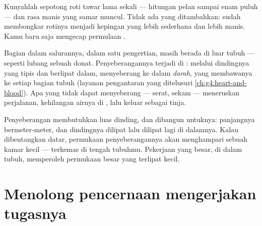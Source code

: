 \begin{example}\label{ex:g4:journey-of-food:sweet}
Kunyahlah sepotong roti tawar lama sekali --- hitungan pelan sampai
enam puluh --- dan rasa manis yang samar muncul. Tidak ada yang
ditambahkan:  sudah membongkar rotinya menjadi kepingan yang
lebih sederhana dan lebih manis. Kamu baru saja mengecap permulaan
.
\end{example}

\begin{proposition}\label{prop:g4:journey-of-food:absorb}
Bagian dalam salurannya, dalam satu pengertian, masih berada di luar
tubuh --- seperti lubang sebuah donat. Penyeberangannya terjadi di
\emph{}: melalui dindingnya yang tipis dan berlipat dalam,
 menyeberang ke dalam \emph{darah}, yang
membawanya ke setiap bagian tubuh (layanan pengantaran yang
ditelusuri \cref{ch:g4:heart-and-blood}). Apa yang tidak dapat
menyeberang --- serat, sekam --- meneruskan perjalanan, kehilangan
airnya di , lalu keluar sebagai tinja.
\end{proposition}
\admitted

\begin{remark}\label{rem:g4:journey-of-food:surface}
Penyeberangan membutuhkan luas dinding, dan  dibangun
untuknya: panjangnya bermeter-meter, dan dindingnya dilipat lalu
dilipat lagi di dalamnya. Kalau dibentangkan datar, permukaan
penyeberangannya akan menghampari sebuah kamar kecil --- terkemas di
tengah tubuhmu. Pekerjaan yang besar, di dalam tubuh, memperoleh
permukaan besar yang terlipat kecil.
\end{remark}

\section{Menolong pencernaan mengerjakan tugasnya}

